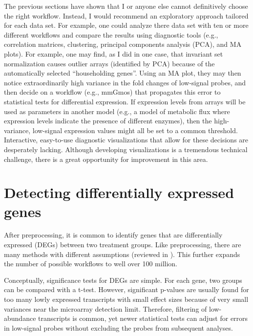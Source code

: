The previous sections have shown that I or anyone
else cannot definitively choose the right workflow. 
Instead, I would recommend an exploratory approach 
tailored for each data set.
For example, one could analyze there data set with ten 
or more different workflows and compare the results
using diagnostic tools (e.g., correlation matrices, clustering,
principal components analysis (PCA), and MA plots).
For example, one may find, as I did in one case, that invariant set
normalization causes outlier arrays (identified by PCA) because
of the automatically selected ``householding genes''.
Using an MA plot, they may then notice extraordinarily
high variance in the fold changes of low-signal probes, and then decide
on a workflow (e.g., mmGmos) that propagates this error to
statistical tests for differential expression. If expression levels
from arrays will be used as parameters in another model (e.g., a model
of metabolic flux where expression levels indicate the presence of 
different enzymes), then the high-variance, low-signal expression values
might all be set to a common threshold.
Interactive, easy-to-use diagnostic visualizations that allow for these
decisions are desperately lacking.
Although developing visualizations is a tremendous technical challenge,
there is a great opportunity for improvement in this area.

\section[Differential expression]{Detecting differentially expressed genes}

After preprocessing, it is common to identify genes that are differentially
expressed (DEGs) between two treatment groups. Like preprocessing,
there are many methods with different assumptions (reviewed in
\cite{Cui:2003vl,Murie:2009dk,Storey:2003kd,Sreekumar:2008wj,
Pan:2002hy,Hong:2008hy,Yanofsky:2010by,Kadota:2011dz,Jeffery:2006bm}). This further expands
the number of possible workflows to well over 100 million.

Conceptually, significance tests for DEGs are simple.
For each gene, two groups can be compared with a t-test.
However, significant p-values are usually found for too many 
lowly expressed transcripts with small effect sizes because of very small
variances near the microarray detection limit.
Therefore, filtering of low-abundance transcripts is common, 
yet newer statistical tests can adjust for errors in low-signal probes
without excluding the probes from subsequent analyses.

